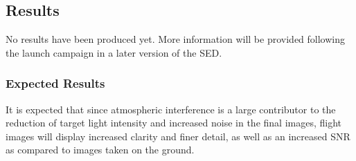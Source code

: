 \subsection{Results}

No results have been produced yet. More information will be provided following the launch campaign in a later version of the SED.

\subsubsection{Expected Results}

It is expected that since atmospheric interference is a large contributor to the reduction of target light intensity and increased noise in the final images, flight images will display increased clarity and finer detail, as well as an increased SNR as compared to images taken on the ground. 
